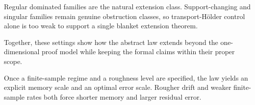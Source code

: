 Regular dominated families are the natural extension class. Support-changing and
singular families remain genuine obstruction classes, so transport-H\"older
control alone is too weak to support a single blanket extension theorem.

Together, these settings show how the abstract law extends beyond the
one-dimensional proof model while keeping the formal claims within their
proper scope.

Once a finite-sample regime and a roughness level are specified, the law yields
an explicit memory scale and an optimal error scale. Rougher drift and weaker
finite-sample rates both force shorter memory and larger residual error.
